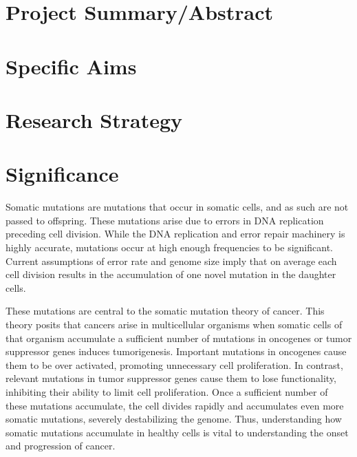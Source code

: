 



\section{Project Summary/Abstract} %



\clearpage

\section{Specific Aims} %



\clearpage

\section{Research Strategy} %


\section{Significance}

Somatic mutations are mutations that occur in somatic cells, and as such are not passed to offspring.
These mutations arise due to errors in DNA replication preceding cell division.
While the DNA replication and error repair machinery is highly accurate, mutations occur at high enough frequencies to be significant.
Current assumptions of error rate and genome size imply that on average each cell division results in the accumulation of one novel mutation in the daughter cells.

These mutations are central to the somatic mutation theory of cancer.
This theory posits that cancers arise in multicellular organisms when somatic cells of that organism accumulate a sufficient number of mutations in oncogenes or tumor suppressor genes induces tumorigenesis.
Important mutations in oncogenes cause them to be over activated, promoting unnecessary cell proliferation.
In contrast, relevant mutations in tumor suppressor genes cause them to lose functionality, inhibiting their ability to limit cell proliferation.
Once a sufficient number of these mutations accumulate, the cell divides rapidly and accumulates even more somatic mutations, severely destabilizing the genome.
Thus, understanding how somatic mutations accumulate in healthy cells is vital to understanding the onset and progression of cancer. 

